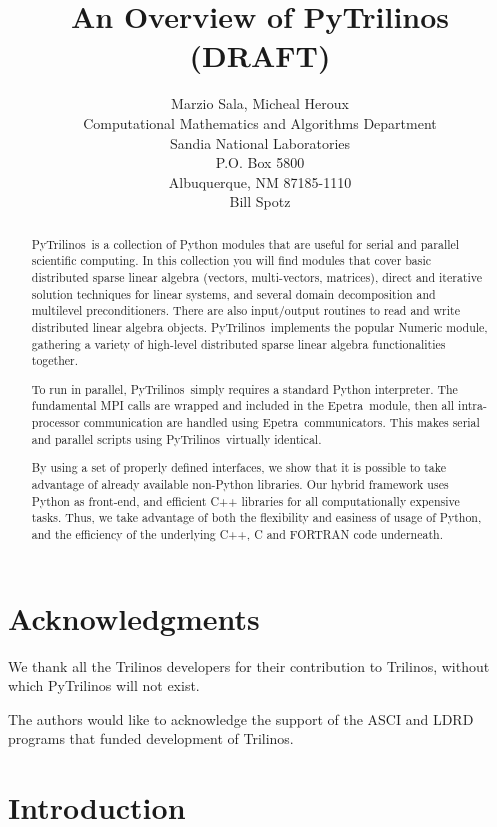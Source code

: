 \documentclass[10pt,relax]{SANDreport}
\author{Marzio Sala, Micheal Heroux\\
Computational Mathematics and Algorithms Department \\
Sandia National Laboratories \\
P.O. Box 5800 \\
Albuquerque, NM 87185-1110 \\[10pt]
Bill Spotz \\[10pt]
}
\title{An Overview of PyTrilinos (DRAFT)}
\newcommand{\PyTrilinos}{{PyTrilinos}}
\newcommand{\epetra}{{Epetra}}
\begin{document}
\maketitle

\begin{abstract}
\PyTrilinos\ is a collection of Python modules that are useful for serial and
parallel scientific
computing. In this collection you will find modules that cover basic
distributed sparse linear algebra (vectors, multi-vectors, matrices), 
direct and iterative solution techniques for linear systems, and several
domain decomposition and multilevel
preconditioners. There are also input/output routines to read and write
distributed linear algebra objects.
\PyTrilinos\ implements the popular Numeric module, gathering a variety of
high-level distributed sparse linear algebra functionalities together.

To run in parallel, \PyTrilinos\ simply requires a standard Python interpreter.
The fundamental MPI calls are wrapped and included in the \epetra\ module, then
all intra-processor communication are handled using \epetra\ communicators. This
makes serial and parallel scripts using \PyTrilinos\ virtually identical.

By using a set of properly defined interfaces, we show that it is possible to
take advantage of already available non-Python libraries. Our hybrid framework
uses Python as front-end, and efficient C++ libraries for all computationally
expensive tasks. Thus, we take advantage of both the flexibility and easiness
of usage of Python, and the efficiency of the underlying C++, C and FORTRAN
code underneath. 
\end{abstract}

\clearpage
\section*{Acknowledgments}
We thank all the Trilinos developers for their contribution to Trilinos,
  without which PyTrilinos will not exist.

The authors would like to acknowledge the support of the ASCI and LDRD programs
that funded development of Trilinos.

\medskip

\SANDmain

\tableofcontents
\newpage

\section{Introduction}
\label{chap:introduction}
\end{document}
